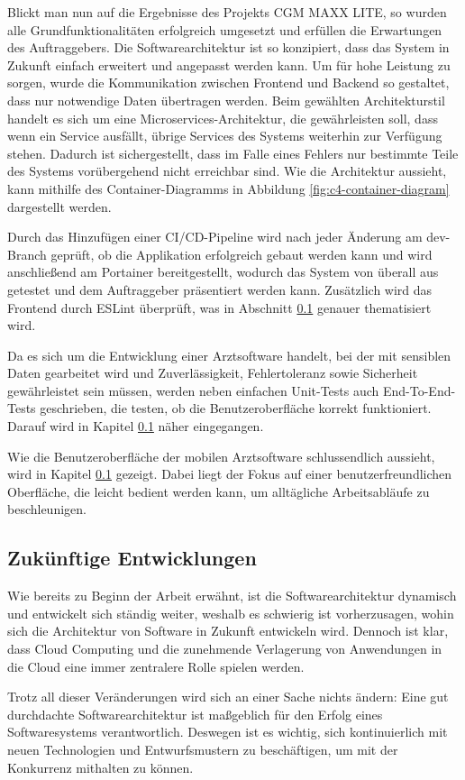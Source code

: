     \clearpage

    Blickt man nun auf die Ergebnisse des Projekts CGM MAXX LITE, so wurden alle Grundfunktionalitäten erfolgreich umgesetzt und erfüllen die Erwartungen des Auftraggebers. Die Softwarearchitektur ist so konzipiert, dass das System in Zukunft einfach erweitert und angepasst werden kann. 
    Um für hohe Leistung zu sorgen, wurde die Kommunikation zwischen Frontend und Backend so gestaltet, dass nur notwendige Daten übertragen werden.
    Beim gewählten Architekturstil handelt es sich um eine Microservices-Architektur, die gewährleisten soll, dass wenn ein Service ausfällt, übrige Services des Systems weiterhin zur Verfügung stehen. Dadurch ist sichergestellt, dass im Falle eines Fehlers nur bestimmte Teile des Systems vorübergehend nicht erreichbar sind.
    Wie die Architektur aussieht, kann mithilfe des Container-Diagramms in Abbildung \ref{fig:c4-container-diagram} dargestellt werden.
    
    Durch das Hinzufügen einer CI/CD-Pipeline wird nach jeder Änderung am dev-Branch geprüft, ob die Applikation erfolgreich gebaut werden kann und wird anschließend am Portainer bereitgestellt, wodurch das System von überall aus getestet und dem Auftraggeber präsentiert werden kann.
    Zusätzlich wird das Frontend durch ESLint überprüft, was in Abschnitt \ref{} genauer thematisiert wird.

    Da es sich um die Entwicklung einer Arztsoftware handelt, bei der mit sensiblen Daten gearbeitet wird und Zuverlässigkeit, Fehlertoleranz sowie Sicherheit gewährleistet sein müssen, werden neben einfachen Unit-Tests auch End-To-End-Tests geschrieben, die testen, ob die Benutzeroberfläche korrekt funktioniert. Darauf wird in Kapitel \ref{} näher eingegangen.

    Wie die Benutzeroberfläche der mobilen Arztsoftware schlussendlich aussieht, wird in Kapitel \ref{} gezeigt.
    Dabei liegt der Fokus auf einer benutzerfreundlichen Oberfläche, die leicht bedient werden kann, um alltägliche Arbeitsabläufe zu beschleunigen.

    
    
    \subsection{Zukünftige Entwicklungen}

    Wie bereits zu Beginn der Arbeit erwähnt, ist die Softwarearchitektur dynamisch und entwickelt sich ständig weiter, weshalb es schwierig ist vorherzusagen, wohin sich die Architektur von Software in Zukunft entwickeln wird. Dennoch ist klar, dass Cloud Computing und die zunehmende Verlagerung von Anwendungen in die Cloud eine immer zentralere Rolle spielen werden.

    Trotz all dieser Veränderungen wird sich an einer Sache nichts ändern: Eine gut durchdachte Softwarearchitektur ist maßgeblich für den Erfolg eines Softwaresystems verantwortlich. Deswegen ist es wichtig, sich kontinuierlich mit neuen Technologien und Entwurfsmustern zu beschäftigen, um mit der Konkurrenz mithalten zu können.
